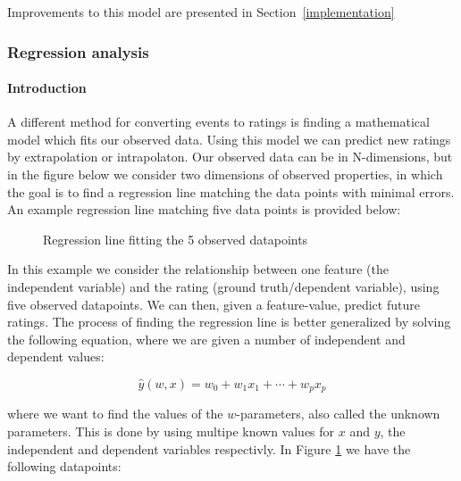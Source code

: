 Improvements to this model are presented in Section~\ref{implementation}

\subsubsection{Regression analysis}

\paragraph{Introduction}
A different method for converting events to ratings is finding a mathematical
model which fits our observed data. Using this model we can predict new ratings
by extrapolation or intrapolaton. Our observed data can be in N-dimensions, but
in the figure below we consider two dimensions of observed properties, in which
the goal is to find a regression line matching the data points with minimal
errors. An example regression line matching five data points is provided below:

\begin{figure}[H]
  \centering
  \label{fig-regression}
  \caption{Regression line fitting the 5 observed datapoints}
\end{figure}

In this example we consider the relationship between one feature (the
independent variable) and the rating (ground truth/dependent variable), using
five observed datapoints. We can then, given a feature-value, predict future
ratings. The process of finding the regression line is better generalized by
solving the following equation, where we are given a number of independent and
dependent values: 

\begin{equation}
  \label{eq-regression}
  \hat{y}(w,x) = w_0 + w_1 x_1 + \cdots + w_p x_p
\end{equation}

where we want to find the values of the $w$-parameters, also called the unknown
parameters. This is done by using multipe known values for $x$ and $y$, the
independent and dependent variables respectivly. In Figure \ref{fig-regression}
we have the following datapoints:

